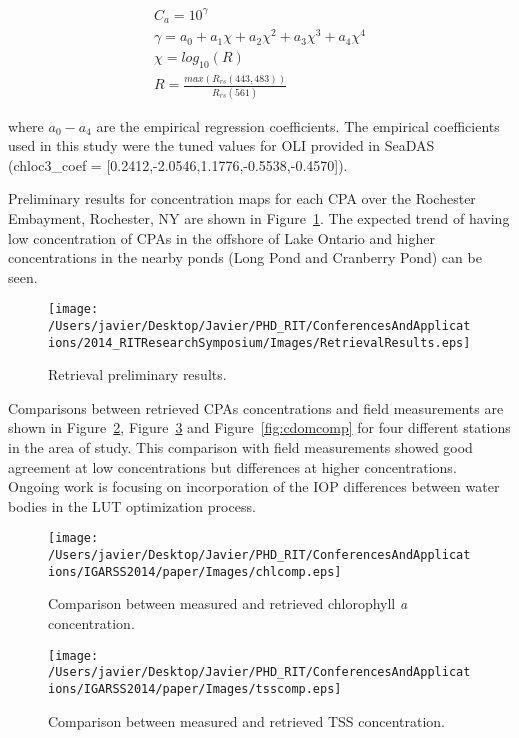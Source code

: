 \begin{equation}
\begin{gathered}
  C_a = 10^{\gamma}\\
  \gamma = a_0+a_1\chi+a_2\chi^2+a_3\chi^3+a_4\chi^4\\
  \chi = log_{10}(R)\\
  R = \frac{max(R_{rs}(443,483))}{R_{rs}(561)}
\end{gathered}
\end{equation}

\noindent where $a_0-a_4$ are the empirical regression coefficients. The empirical coefficients used in this study were the tuned values for OLI provided in SeaDAS (chloc3\_coef = [0.2412,-2.0546,1.1776,-0.5538,-0.4570]).


 Preliminary results for concentration maps for each CPA over the Rochester Embayment, Rochester, NY are shown in Figure~\ref{fig:retrievalresults}. The expected trend of having low concentration of CPAs in the offshore of Lake Ontario and higher concentrations in the nearby ponds (Long Pond and Cranberry Pond) can be seen. 
\begin{figure}[htb]
\centering
\texttt{[image: /Users/javier/Desktop/Javier/PHD\_RIT/ConferencesAndApplications/2014\_RITResearchSymposium/Images/RetrievalResults.eps]}
   \caption{Retrieval preliminary results.}
      \label{fig:retrievalresults}   
\end{figure}

Comparisons between retrieved CPAs concentrations and field measurements are shown in Figure~\ref{fig:chlcomp}, Figure~\ref{fig:tsscomp} and Figure~\ref{fig:cdomcomp} for four different stations in the area of study. This comparison with field measurements showed good agreement at low concentrations but differences at higher concentrations. Ongoing work is focusing on incorporation of the IOP differences between water bodies in the LUT optimization process.
\begin{figure}[htb]
\centering
    \texttt{[image: /Users/javier/Desktop/Javier/PHD\_RIT/ConferencesAndApplications/IGARSS2014/paper/Images/chlcomp.eps]} 
    \caption{Comparison between measured and retrieved chlorophyll {\it a} concentration.}
    \label{fig:chlcomp} 
\end{figure}     

\begin{figure}[htb]
\centering
    \texttt{[image: /Users/javier/Desktop/Javier/PHD\_RIT/ConferencesAndApplications/IGARSS2014/paper/Images/tsscomp.eps]}   
    \caption{Comparison between measured and retrieved TSS concentration.}
    \label{fig:tsscomp} 
\end{figure}  

